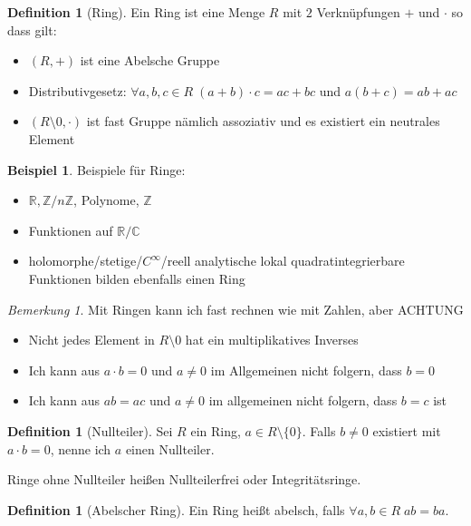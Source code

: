 \documentclass[12pt,parskip=full]{scrartcl}
\newcommand{\setZ}{\mathbb{Z}}
\newcommand{\setR}{\mathbb{R}}
\newcommand{\setC}{\mathbb{C}}
\theoremstyle{definition}
\newtheorem{definition}[theorem]{Definition}
\newtheorem{example}[theorem]{Beispiel}
\theoremstyle{remark}
\newtheorem*{remark}{Bemerkung}
\begin{document}
	\begin{definition}[Ring]
		Ein Ring ist eine Menge $R$ mit $2$ Verknüpfungen $+$ und $\cdot$ so dass gilt:
		\begin{itemize}
			\item $(R,+)$ ist eine Abelsche Gruppe
			\item Distributivgesetz: $\forall a,b,c \in R \; (a+b) \cdot c = ac + bc$ und $a(b+c) = ab + ac$
			\item $(R \setminus 0, \cdot)$ ist fast Gruppe nämlich assoziativ und es existiert ein neutrales Element
		\end{itemize}
	\end{definition}

	\begin{example}
		Beispiele für Ringe:
		\begin{itemize}
			\item $\setR, \setZ / n\setZ$, Polynome, $\setZ$
			\item Funktionen auf $\setR / \setC$
			\item holomorphe/stetige/$C^\infty$/reell analytische lokal quadratintegrierbare Funktionen bilden ebenfalls einen Ring
		\end{itemize}
	\end{example}

	\begin{remark}
		Mit Ringen kann ich fast rechnen wie mit Zahlen, aber ACHTUNG
		\begin{itemize}
			\item Nicht jedes Element in $R \setminus 0$ hat ein multiplikatives Inverses
			\item Ich kann aus $a \cdot b = 0$ und $a \neq 0$ im Allgemeinen nicht folgern, dass $b = 0$
			\item Ich kann aus $ab = ac$ und $a \neq 0$ im allgemeinen nicht folgern, dass $b = c$ ist
		\end{itemize}
	\end{remark}

	\begin{definition}[Nullteiler]
		Sei $R$ ein Ring, $a \in R \setminus \{0\}$. Falls $b \neq 0$ existiert mit $a \cdot b = 0$, nenne ich $a$ einen Nullteiler.
		
		Ringe ohne Nullteiler heißen Nullteilerfrei oder Integritätsringe.
	\end{definition}

	\begin{definition}[Abelscher Ring]
		Ein Ring heißt abelsch, falls $\forall a,b \in R \; ab = ba$.
	\end{definition}
\end{document}
